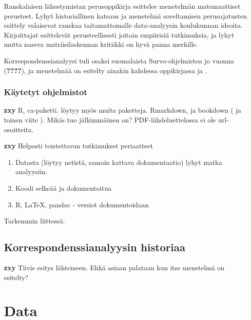 \documentclass[finnish,]{book}
\providecommand{\tightlist}{%
  \setlength{\itemsep}{0pt}\setlength{\parskip}{0pt}}
\theoremstyle{definition}
\theoremstyle{definition}
\theoremstyle{definition}
\theoremstyle{remark}
\begin{document}
Ranskalaisen lähestymistan
perusoppikirja\citep{RefWorks:doc:5a857a43e4b0ed2d44664d75} esittelee
menetelmän matemaattiset perusteet. Lyhyt historiallinen katsaus ja
menetelmä soveltamisen perusajatusten esittely valaisevat ranskaa
taitamattomalle data-analyysin koulukunnan ideoita. Kirjoittajat
esittelevät perusteellisesti joitain empiirisiä tutkimuksia, ja lyhyt
mutta naseva matriisilaskennan kritiikki on hyvä panna merkille.

Korrespondenssianalyysi tuli osaksi suomalaista Survo-ohjelmistoa jo
vuonna (\textbf{????}), ja menetelmää on esitelty ainakin kahdessa
oppikirjassa\citep{RefWorks:doc:5a857a44e4b0ed2d44664d95} ja
\citep{RefWorks:doc:5a857a44e4b0ed2d44664da4}.

\hypertarget{kaytetyt-ohjelmistot}{%
\subsection{Käytetyt ohjelmistot}\label{kaytetyt-ohjelmistot}}

\textbf{zxy} R, ca-paketti. löytyy myös muita paketteja.
Rmarkdown\citep{RefWorks:doc:5b6b346fe4b0c619b11b8a3e}, ja bookdown
(\citep{RefWorks:doc:5b6b36dde4b09b7ec442bf8b} ja toinen viite
\citep{R-bookdown}). Mikäs tuo jälkimmäinen on? PDF-lähdeluettelossa ei
ole url-osoitteita.

\textbf{zxy} Helposti toistettavan tutkimukset periaatteet

\begin{enumerate}
\def\labelenumi{\arabic{enumi}.}
\tightlist
\item
  Datasta (löytyy netistä, samoin kattava dokumentaatio) lyhyt matka
  analyysiin.
\item
  Koodi selkeää ja dokumentoitua
\item
  R, LaTeX, pandoc - versiot dokumentoidaan
\end{enumerate}

Tarkemmin liittessä.

\hypertarget{korrespondenssianalyysin-historiaa}{%
\section{Korrespondenssianalyysin
historiaa}\label{korrespondenssianalyysin-historiaa}}

\textbf{zxy} Tiivis esitys lähteineen. Ehkä asiaan palataan kun itse
menetelmä on esitelty?

\hypertarget{data}{%
\chapter{Data}\label{data}}
\end{document}
